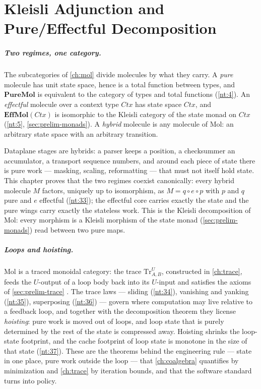 \chapter{Kleisli Adjunction and Pure/Effectful Decomposition}\label{ch:kleisli}

\paragraph{Two regimes, one category.}
The subcategories of \autoref{ch:mol} divide molecules by what they carry.
A \emph{pure} molecule has unit state space, hence is a total function
between types, and $\mathbf{PureMol}$ is equivalent to the category of
types and total functions (\autoref{nt:4}). An \emph{effectful} molecule
over a context type $\mathit{Ctx}$ has state space $\mathit{Ctx}$, and
$\mathbf{EffMol}(\mathit{Ctx})$ is isomorphic to the Kleisli category of
the state monad on $\mathit{Ctx}$ (\autoref{nt:5},
\autoref{sec:prelim-monads}). A \emph{hybrid} molecule is any molecule of
Mol: an arbitrary state space with an arbitrary transition.

Dataplane stages are hybrids: a parser keeps a position, a checksummer an
accumulator, a transport sequence numbers, and around each piece of state
there is pure work --- masking, scaling, reformatting --- that must not
itself hold state. This chapter proves that the two regimes coexist
canonically: every hybrid molecule $M$ factors, uniquely up to
isomorphism, as $M = q \circ e \circ p$ with $p$ and $q$ pure and $e$
effectful (\autoref{nt:33}); the effectful core carries exactly the state
and the pure wings carry exactly the stateless work. This is the Kleisli
decomposition of Mol: every morphism is a Kleisli morphism of the state
monad (\autoref{sec:prelim-monads}) read between two pure maps.

\paragraph{Loops and hoisting.}
Mol is a traced monoidal category: the trace $\mathrm{Tr}^{U}_{A,B}$,
constructed in \autoref{ch:trace}, feeds the $U$-output of a loop body back
into its $U$-input and satisfies the axioms of \autoref{sec:prelim-trace}
\citep{joyalsv}. The trace laws --- sliding (\autoref{nt:34}), vanishing
and yanking (\autoref{nt:35}), superposing (\autoref{nt:36}) --- govern
where computation may live relative to a feedback loop, and together with
the decomposition theorem they license \emph{hoisting}: pure work is moved
out of loops, and loop state that is purely determined by the rest of the
state is compressed away. Hoisting shrinks the loop-state footprint, and
the cache footprint of loop state is monotone in the size of that state
(\autoref{nt:37}). These are the theorems behind the engineering rule ---
state in one place, pure work outside the loop --- that
\autoref{ch:coalgebra} quantifies by minimization and \autoref{ch:trace}
by iteration bounds, and that the software standard turns into policy.

